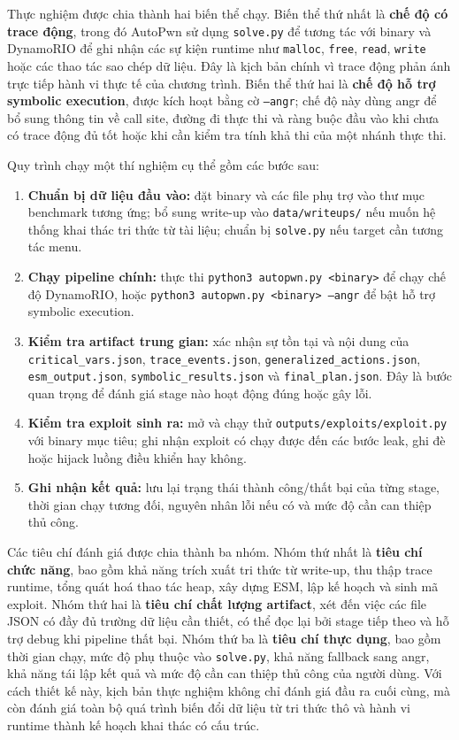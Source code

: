 \documentclass[final]{hcmuitthesis}
\begin{document}
Thực nghiệm được chia thành hai biến thể chạy. Biến thể thứ nhất là \textbf{chế độ có trace động}, trong đó AutoPwn sử dụng \texttt{solve.py} để tương tác với binary và DynamoRIO để ghi nhận các sự kiện runtime như \texttt{malloc}, \texttt{free}, \texttt{read}, \texttt{write} hoặc các thao tác sao chép dữ liệu. Đây là kịch bản chính vì trace động phản ánh trực tiếp hành vi thực tế của chương trình. Biến thể thứ hai là \textbf{chế độ hỗ trợ symbolic execution}, được kích hoạt bằng cờ \texttt{--angr}; chế độ này dùng angr để bổ sung thông tin về call site, đường đi thực thi và ràng buộc đầu vào khi chưa có trace động đủ tốt hoặc khi cần kiểm tra tính khả thi của một nhánh thực thi.

Quy trình chạy một thí nghiệm cụ thể gồm các bước sau:
\begin{enumerate}
    \item \textbf{Chuẩn bị dữ liệu đầu vào:} đặt binary và các file phụ trợ vào thư mục benchmark tương ứng; bổ sung write-up vào \texttt{data/writeups/} nếu muốn hệ thống khai thác tri thức từ tài liệu; chuẩn bị \texttt{solve.py} nếu target cần tương tác menu.
    \item \textbf{Chạy pipeline chính:} thực thi \texttt{python3 autopwn.py <binary>} để chạy chế độ DynamoRIO, hoặc \texttt{python3 autopwn.py <binary> --angr} để bật hỗ trợ symbolic execution.
    \item \textbf{Kiểm tra artifact trung gian:} xác nhận sự tồn tại và nội dung của \texttt{critical\_vars.json}, \texttt{trace\_events.json}, \texttt{generalized\_actions.json}, \texttt{esm\_output.json}, \texttt{symbolic\_results.json} và \texttt{final\_plan.json}. Đây là bước quan trọng để đánh giá stage nào hoạt động đúng hoặc gây lỗi.
    \item \textbf{Kiểm tra exploit sinh ra:} mở và chạy thử \texttt{outputs/exploits/exploit.py} với binary mục tiêu; ghi nhận exploit có chạy được đến các bước leak, ghi đè hoặc hijack luồng điều khiển hay không.
    \item \textbf{Ghi nhận kết quả:} lưu lại trạng thái thành công/thất bại của từng stage, thời gian chạy tương đối, nguyên nhân lỗi nếu có và mức độ cần can thiệp thủ công.
\end{enumerate}

Các tiêu chí đánh giá được chia thành ba nhóm. Nhóm thứ nhất là \textbf{tiêu chí chức năng}, bao gồm khả năng trích xuất tri thức từ write-up, thu thập trace runtime, tổng quát hoá thao tác heap, xây dựng ESM, lập kế hoạch và sinh mã exploit. Nhóm thứ hai là \textbf{tiêu chí chất lượng artifact}, xét đến việc các file JSON có đầy đủ trường dữ liệu cần thiết, có thể đọc lại bởi stage tiếp theo và hỗ trợ debug khi pipeline thất bại. Nhóm thứ ba là \textbf{tiêu chí thực dụng}, bao gồm thời gian chạy, mức độ phụ thuộc vào \texttt{solve.py}, khả năng fallback sang angr, khả năng tái lập kết quả và mức độ cần can thiệp thủ công của người dùng. Với cách thiết kế này, kịch bản thực nghiệm không chỉ đánh giá đầu ra cuối cùng, mà còn đánh giá toàn bộ quá trình biến đổi dữ liệu từ tri thức thô và hành vi runtime thành kế hoạch khai thác có cấu trúc.
\end{document}
